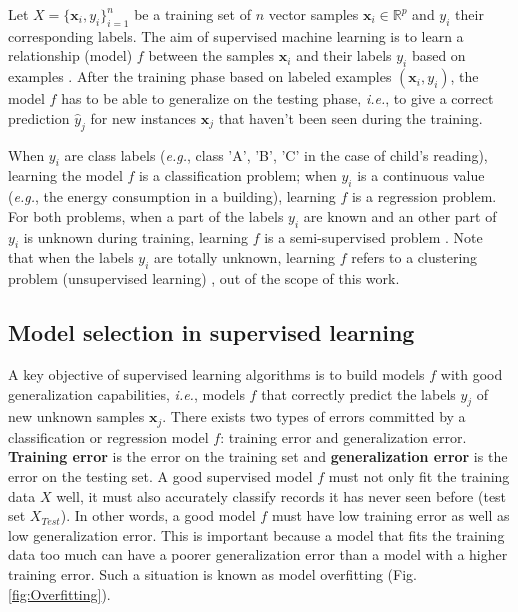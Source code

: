 Let $X=\{\textbf{x}_i,y_i\}_{i=1}^n$ be a training set of $n$ vector samples $\textbf{x}_i \in \mathbb{R}^p$ and $y_i$ their corresponding labels. The aim of supervised machine learning is to learn a relationship (model) $f$ between the samples $\textbf{x}_i$ and their labels $y_i$ based on examples \cite{Bishop2006,Dreyfus2006,Duda1973}. %
After the training phase based on labeled examples $(\textbf{x}_i,y_i)$, the model $f$ has to be able to generalize on the testing phase, \textit{i.e.}, to give a correct prediction $\hat{y}_j$ for new instances $\textbf{x}_j$ that haven't been seen during the training.

When $y_i$ are class labels (\textit{e.g.}, class 'A', 'B', 'C' in the case of child's reading), learning the model $f$ is a classification problem; when $y_i$ is a continuous value (\textit{e.g.}, the energy consumption in a building), learning $f$ is a regression problem. 
For both problems, when a part of the labels $y_i$ are known and an other part of $y_i$ is unknown during training, learning $f$ is a semi-supervised problem \cite{Zhu2007}. Note that when the labels $y_i$ are totally unknown, learning $f$ refers to a clustering problem (unsupervised learning) \cite{Jain1999,Chen1996}, out of the scope of this work.



\subsection{Model selection in supervised learning}
\label{sec:model_selection}
A key objective of supervised learning algorithms is to build models $f$ with good generalization capabilities, \textit{i.e.}, models $f$ that correctly predict the labels $y_j$ of new unknown samples $\textbf{x}_j$. There exists two types of errors committed by a classification or regression model $f$: training error and generalization error. \textbf{Training error} is the error on the training set and \textbf{generalization error} is the error on the testing set. A good supervised model $f$ must not only fit the training data $X$ well, it must also accurately classify records it has never seen before (test set $X_{Test}$). In other words, a good model $f$ must have low training error as well as low generalization error. This is important because a model that fits the training data too much can have a poorer generalization error than a model with a higher training error. Such a situation is known as model overfitting (Fig. \ref{fig:Overfitting}).

